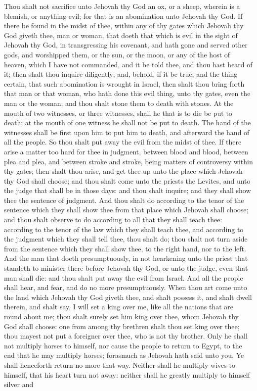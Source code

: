 Thou shalt not sacrifice unto Jehovah thy God an ox, or a sheep, wherein is a blemish, or anything evil; for that is an abomination unto Jehovah thy God.  If there be found in the midst of thee, within any of thy gates which Jehovah thy God giveth thee, man or woman, that doeth that which is evil in the sight of Jehovah thy God, in transgressing his covenant, and hath gone and served other gods, and worshipped them, or the sun, or the moon, or any of the host of heaven, which I have not commanded, and it be told thee, and thou hast heard of it; then shalt thou inquire diligently; and, behold, if it be true, and the thing certain, that such abomination is wrought in Israel, then shalt thou bring forth that man or that woman, who hath done this evil thing, unto thy gates, even the man or the woman; and thou shalt stone them to death with stones. At the mouth of two witnesses, or three witnesses, shall he that is to die be put to death; at the mouth of one witness he shall not be put to death. The hand of the witnesses shall be first upon him to put him to death, and afterward the hand of all the people. So thou shalt put away the evil from the midst of thee.  If there arise a matter too hard for thee in judgment, between blood and blood, between plea and plea, and between stroke and stroke, being matters of controversy within thy gates; then shalt thou arise, and get thee up unto the place which Jehovah thy God shall choose; and thou shalt come unto the priests the Levites, and unto the judge that shall be in those days: and thou shalt inquire; and they shall show thee the sentence of judgment. And thou shalt do according to the tenor of the sentence which they shall show thee from that place which Jehovah shall choose; and thou shalt observe to do according to all that they shall teach thee: according to the tenor of the law which they shall teach thee, and according to the judgment which they shall tell thee, thou shalt do; thou shalt not turn aside from the sentence which they shall show thee, to the right hand, nor to the left. And the man that doeth presumptuously, in not hearkening unto the priest that standeth to minister there before Jehovah thy God, or unto the judge, even that man shall die: and thou shalt put away the evil from Israel. And all the people shall hear, and fear, and do no more presumptuously.  When thou art come unto the land which Jehovah thy God giveth thee, and shalt possess it, and shalt dwell therein, and shalt say, I will set a king over me, like all the nations that are round about me; thou shalt surely set him king over thee, whom Jehovah thy God shall choose: one from among thy brethren shalt thou set king over thee; thou mayest not put a foreigner over thee, who is not thy brother. Only he shall not multiply horses to himself, nor cause the people to return to Egypt, to the end that he may multiply horses; forasmuch as Jehovah hath said unto you, Ye shall henceforth return no more that way. Neither shall he multiply wives to himself, that his heart turn not away: neither shall he greatly multiply to himself silver and 